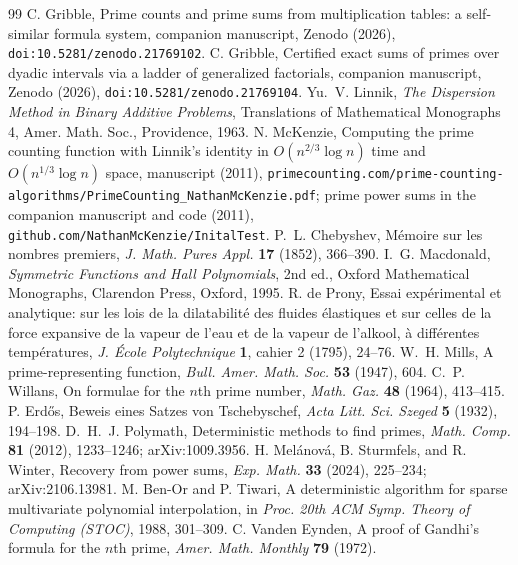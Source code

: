 \documentclass[11pt]{article}
\theoremstyle{remark}
\begin{document}
\begin{thebibliography}{99}
 C. Gribble, Prime counts and prime sums from multiplication tables: a
self-similar formula system, companion manuscript, Zenodo (2026), \texttt{doi:10.5281/zenodo.21769102}.
 C. Gribble, Certified exact sums of primes over dyadic intervals via a ladder
of generalized factorials, companion manuscript, Zenodo (2026), \texttt{doi:10.5281/zenodo.21769104}.
 Yu.~V. Linnik, \emph{The Dispersion Method in Binary Additive Problems},
Translations of Mathematical Monographs 4, Amer. Math. Soc., Providence, 1963.
 N. McKenzie, Computing the prime counting function with Linnik's identity in
$O(n^{2/3} \log n)$ time and $O(n^{1/3} \log n)$ space, manuscript (2011),
\texttt{primecounting.com/prime-counting-algorithms/}\allowbreak\texttt{PrimeCounting\_NathanMcKenzie.pdf}; prime power
sums in the companion manuscript and code (2011), \texttt{github.com/NathanMcKenzie/InitalTest}.
 P.~L. Chebyshev, M\'emoire sur les nombres premiers, \emph{J. Math. Pures Appl.}
\textbf{17} (1852), 366--390.
 I.~G. Macdonald, \emph{Symmetric Functions and Hall Polynomials}, 2nd ed.,
Oxford Mathematical Monographs, Clarendon Press, Oxford, 1995.
 R. de Prony, Essai exp\'erimental et analytique: sur les lois de la dilatabilit\'e
des fluides \'elastiques et sur celles de la force expansive de la vapeur de l'eau et de la vapeur de
l'alkool, \`a diff\'erentes temp\'eratures, \emph{J. \'Ecole Polytechnique} \textbf{1}, cahier 2
(1795), 24--76.
 W.~H. Mills, A prime-representing function, \emph{Bull. Amer. Math. Soc.} \textbf{53}
(1947), 604.
 C.~P. Willans, On formulae for the $n$th prime number, \emph{Math. Gaz.} \textbf{48}
(1964), 413--415.
 P. Erd\H{o}s, Beweis eines Satzes von Tschebyschef, \emph{Acta Litt. Sci. Szeged}
\textbf{5} (1932), 194--198.
 D.~H.~J. Polymath, Deterministic methods to find primes, \emph{Math. Comp.}
\textbf{81} (2012), 1233--1246; arXiv:1009.3956.
 H. Mel\'anov\'a, B. Sturmfels, and R. Winter, Recovery from power sums,
\emph{Exp. Math.} \textbf{33} (2024), 225--234; arXiv:2106.13981.
 M. Ben-Or and P. Tiwari, A deterministic algorithm for sparse multivariate polynomial
interpolation, in \emph{Proc. 20th ACM Symp. Theory of Computing (STOC)}, 1988, 301--309.
 C. Vanden Eynden, A proof of Gandhi's formula for the $n$th prime,
\emph{Amer. Math. Monthly} \textbf{79} (1972).

\end{thebibliography}
\end{document}
